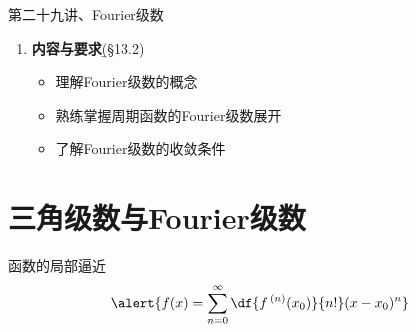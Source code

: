 
\begin{frame}{第二十九讲、Fourier级数}
	\linespread{1.5}
	\begin{enumerate}
	  \item {\bf 内容与要求}{\b (\S 13.2)}
	  \begin{itemize}
		\item 理解Fourier级数的概念
		\item 熟练掌握周期函数的Fourier级数展开
		\item 了解Fourier级数的收敛条件
	  \vspace{1em}
	  \end{itemize}
	\end{enumerate}
\end{frame}

\section{三角级数与Fourier级数}

\begin{frame}{函数的局部逼近}
	\linespread{1.2}
	$$\alert{f(x)=\sum\limits_{n=0}^{\infty}\df{f\,^{(n)}(x_0)}{n!}(x-x_0)^n}$$
	\begin{center}
	\end{center}
\end{frame}


